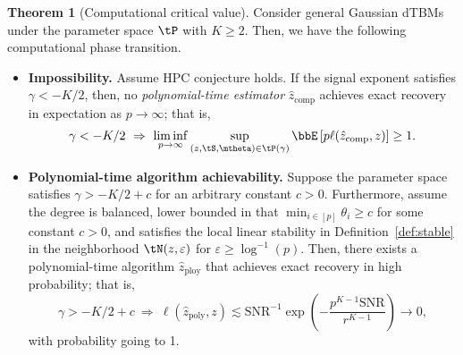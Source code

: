 \documentclass[lettersize,onecolumn,journal]{IEEEtran}
\theoremstyle{definition}
\newtheorem{thm}{Theorem}
\theoremstyle{definition}
\newcommand{\of}[1]{\left(#1\right)}
\begin{document}
{
  
\begin{thm}[Computational critical value]\label{thm:comp} 
Consider general Gaussian dTBMs under the parameter space $\tP$ with $K\geq 2$. Then, we have the following computational phase transition.

\begin{itemize}[wide]
    \item \textbf{Impossibility.} Assume HPC conjecture holds. If the signal exponent satisfies $\gamma < -K/2$, then, no \emph{polynomial-time estimator} $\hat z_{\text{comp}}$ achieves exact recovery in expectation as $p\to \infty$; that is, 
\begin{align}
  \gamma<-K/2 \ \Rightarrow \ \liminf_{p\to \infty}\sup_{(z, \tS, \mtheta) \in \tP(\gamma)}  \bbE \left[ p\ell(\hat z_{\text{comp}}, z) \right]\geq 1.
\end{align}
\item \textbf{Polynomial-time algorithm achievability.} Suppose the parameter space satisfies $\gamma  >  -K/2+c$ for an arbitrary constant $c>0$. Furthermore, assume the degree is balanced, lower bounded in that $\min_{i\in[p]}\theta_i\geq c$ for some constant $c>0$, and satisfies the local linear stability in Definition~\ref{def:stable} in the neighborhood $\tN(z,\varepsilon)$ for $\varepsilon \geq \log^{-1}(p)$. Then, there exists a polynomial-time algorithm $\hat z_{\text{ploy}}$ that achieves exact recovery in high probability; that is,
\begin{equation}
  \gamma>-K/2+c\ \Rightarrow   \  \ell(\hat z_{\text{poly}}, z) \lesssim \text{SNR}^{-1}\exp \of{ - \frac{p^{K-1}\text{SNR}}{r^{K-1}} } \to 0,
\end{equation}
with probability going to 1. 
\end{itemize}

\end{thm}
}
\end{document}
